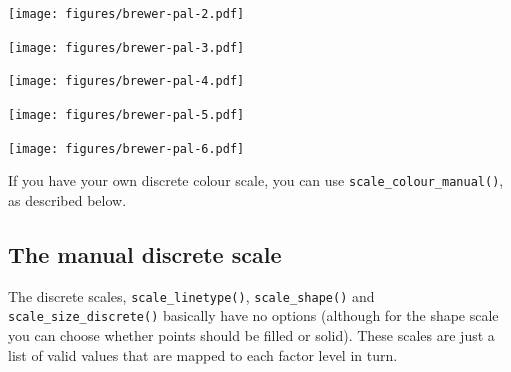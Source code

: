\texttt{[image: figures/brewer-pal-2.pdf]}

\begin{Shaded}
\begin{Highlighting}[]
\StringTok{ }\NormalTok{(} \NormalTok{)}
\end{Highlighting}
\end{Shaded}

\texttt{[image: figures/brewer-pal-3.pdf]}

\begin{Shaded}
\begin{Highlighting}[]
\StringTok{ }\NormalTok{(} \NormalTok{)}
\end{Highlighting}
\end{Shaded}

\texttt{[image: figures/brewer-pal-4.pdf]}

\begin{Shaded}
\begin{Highlighting}[]
\StringTok{ }\NormalTok{(} \NormalTok{)}
\end{Highlighting}
\end{Shaded}

\texttt{[image: figures/brewer-pal-5.pdf]}

\begin{Shaded}
\begin{Highlighting}[]
\StringTok{ }\NormalTok{(} \NormalTok{)}
\end{Highlighting}
\end{Shaded}

\texttt{[image: figures/brewer-pal-6.pdf]}

If you have your own discrete colour scale, you can use
\texttt{scale\_colour\_manual()}, as described below.

\subsection{The manual discrete scale}\label{sub:scale-manual}

The discrete scales, \texttt{scale\_linetype()}, \texttt{scale\_shape()}
and \texttt{scale\_size\_discrete()} basically have no options (although
for the shape scale you can choose whether points should be filled or
solid). These scales are just a list of valid values that are mapped to
each factor level in turn.  


